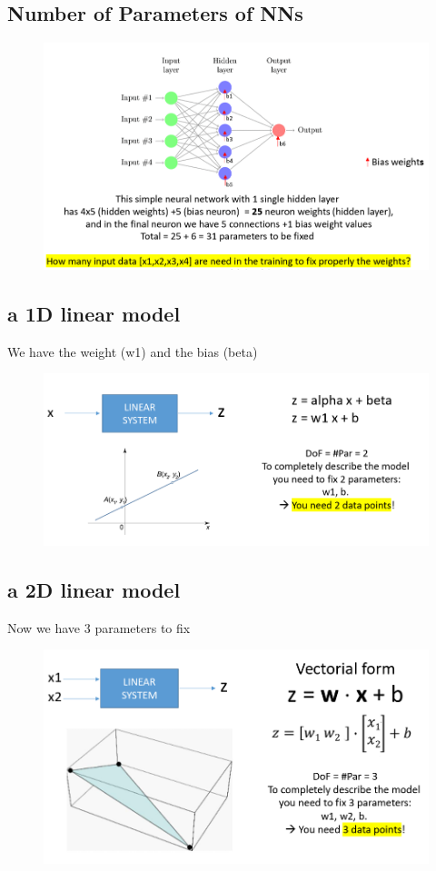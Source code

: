 \documentclass{report}
\begin{document}
\subsection{Number of Parameters of NNs}
\begin{figure}[H]
    \centering
    \includegraphics[width=0.8\linewidth]{images/nns.png}
\end{figure}

\subsection{a 1D linear model}
\noindent We have the weight (w1) and the bias (beta)
\begin{figure}[H]
    \centering
    \includegraphics[width=0.8\linewidth]{images/d1.png}
\end{figure}

\subsection{a 2D linear model}
Now we have 3 parameters to fix
\begin{figure}[H]
    \centering
    \includegraphics[width=0.8\linewidth]{images/2d.png}
\end{figure}
\end{document}
